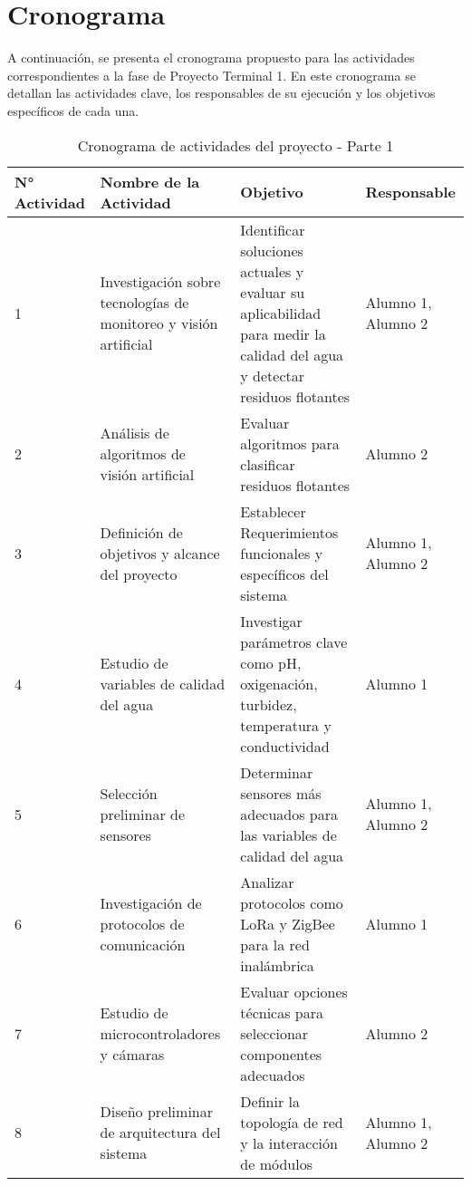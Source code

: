 \section{Cronograma}
A continuación, se presenta el cronograma propuesto para las actividades correspondientes a la fase de Proyecto Terminal 1. En este cronograma se detallan las actividades clave, los responsables de su ejecución y los objetivos específicos de cada una.

\begin{table}[H]
    \centering
    \renewcommand{\arraystretch}{1.5}
    \begin{tabular}{ |p{1.5cm}|p{5cm}|p{5.5cm}|p{2.5cm}| }

        \hline
        \textbf{N° Actividad} & \textbf{Nombre de la Actividad} & \textbf{Objetivo} & \textbf{Responsable} \\
        \hline
        1 & Investigación sobre tecnologías de monitoreo y visión artificial & Identificar soluciones actuales y evaluar su aplicabilidad para medir la calidad del agua y detectar residuos flotantes & Alumno 1, Alumno 2 \\\hline
        2 & Análisis de algoritmos de visión artificial & Evaluar algoritmos para clasificar residuos flotantes & Alumno 2 \\\hline
        3 & Definición de objetivos y alcance del proyecto & Establecer Requerimientos funcionales y específicos del sistema & Alumno 1, Alumno 2 \\\hline
        4 & Estudio de variables de calidad del agua & Investigar parámetros clave como pH, oxigenación, turbidez, temperatura y conductividad & Alumno 1 \\\hline
        5 & Selección preliminar de sensores & Determinar sensores más adecuados para las variables de calidad del agua & Alumno 1, Alumno 2 \\\hline
        6 & Investigación de protocolos de comunicación & Analizar protocolos como LoRa y ZigBee para la red inalámbrica & Alumno 1 \\\hline
        7 & Estudio de microcontroladores y cámaras & Evaluar opciones técnicas para seleccionar componentes adecuados & Alumno 2 \\\hline
        8 & Diseño preliminar de arquitectura del sistema & Definir la topología de red y la interacción de módulos & Alumno 1, Alumno 2 \\\hline

    \end{tabular}
    \caption{Cronograma de actividades del proyecto - Parte 1}
    \label{tab:cronograma_proyecto_parte1}
\end{table}
